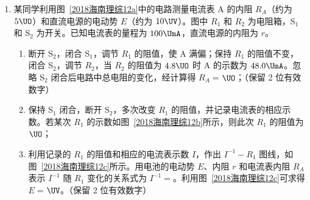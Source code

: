 \documentclass[\gkver]{gaokaozhenti}
\begin{document}
\begin{enumerate}
{\begin{enumerate}
\end{enumerate}
}

\item
某同学利用图~\ref{2018海南理综12a}中的电路测量电流表 A 的内阻 $R_{A}$（约为 $5\UO$）和直流电源的电动势 $E$（约为 $10\UV$）。图中 $R_{1}$ 和 $R_{2}$ 为电阻箱，S$_{1}$ 和 S$_{2}$ 为开关。已知电流表的量程为 $100\UmA$，直流电源的内阻为 $r$。

\begin{enumerate}
	\item
	断开 S$_{2}$，闭合 S$_{1}$，调节 $R_{1}$ 的阻值，使 A 满偏；保持 $R_{1}$ 的阻值不变，闭合 S$_{2}$，调节 $R_{2}$，当 $R_{2}$ 的阻值为 $4.8\UO$ 时 A 的示数为 $48.0\UmA$。忽略 S$_{2}$ 闭合后电路中总电阻的变化，经计算得 $R_{A} = $$\UO$；（保留 2 位有效数字）
	\item
	保持 S$_{1}$ 闭合，断开 S$_{2}$，多次改变 $R_{1}$ 的阻值，并记录电流表的相应示数。若某次 $R_{1}$ 的示数如图~\ref{2018海南理综12b}所示，则此次 $R_{1}$ 的阻值为$\UO$；
	\item
	利用记录的 $R_{1}$ 的阻值和相应的电流表示数 $I$，作出 $I^{-1}-R_{1}$ 图线，如图~\ref{2018海南理综12c}所示。用电池的电动势 $E$、内阻 $r$ 和电流表内阻 $R_{A}$ 表示 $I^{-1}$ 随 $R_{1}$ 变化的关系式为 $I^{-1} = $。利用图~\ref{2018海南理综12c}可求得 $E = $$\UV$。（保留 2 位有效数字）
\end{enumerate}



\end{enumerate}
\end{document}
